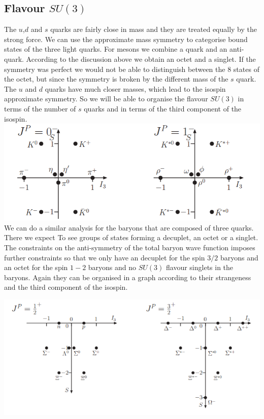 \documentclass[12pt]{article}
\begin{document}
\subsection{Flavour $SU(3)$}
The $u$,$d$ and $s$ quarks are fairly close in mass and they are treated equally by the strong force. We can use the approximate mass symmetry to categorise bound states of the three light quarks. For mesons we combine a quark and an anti-quark. According to the discussion above we obtain an octet and a singlet. If the symmetry was perfect we would not be able to distinguish between the $8$ states of the octet, but since the symmetry is broken by the different mass of the $s$ quark. The $u$ and $d$ quarks have much closer masses, which lead to the isospin approximate symmetry. So we will be able to organise the flavour $SU(3)$ in terms of the number of $s$ quarks and in terms of the third component of the isospin.
\includegraphics[scale=0.5]{images/mesons.png}
We can do a similar analysis for the baryons that are composed of three quarks. There we expect To see groups of states forming a decuplet, an octet or a singlet. The constraints on the anti-symmetry of the total baryon wave function imposes further constraints so that we only have an decuplet for the spin $3/2$ baryons and an octet for the spin $1-2$ baryons and no $SU(3)$ flavour singlets in the baryons. Again they can be organised in a graph according to their strangeness and the third component of the isospin. 

\includegraphics[scale=0.5]{images/baryons.png}
\end{document}
